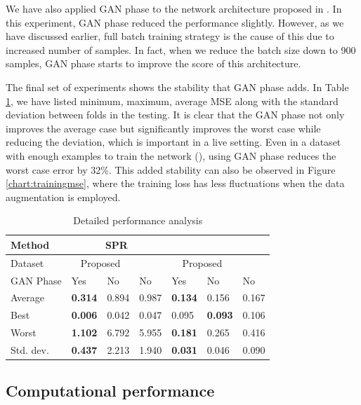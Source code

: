 \documentclass[10pt]{IEEEtran}
\begin{document}
We have also applied GAN phase to the network architecture proposed in \cite{paper0}. In this experiment, GAN phase reduced the performance slightly. However, as we have discussed earlier, full batch training strategy is the cause of this due to increased number of samples. In fact, when we reduce the batch size down to 900 samples, GAN phase starts to improve the score of this architecture.


The final set of experiments shows the stability that GAN phase adds. In Table \ref{tbl:all}, we have listed minimum, maximum, average MSE along with the standard deviation between folds in the testing. It is clear that the GAN phase not only improves the average case but significantly improves the worst case while reducing the deviation, which is important in a live setting. Even in a dataset with enough examples to train the network (\dszero), using GAN phase reduces the worst case error by 32\%. This added stability can also be observed in Figure \ref{chart:trainingmse}, where the training loss has less fluctuations when the data augmentation is employed.


\begin{table}
\caption{Detailed performance analysis}
\begin{tabular}{l|l|l|l|l|l|l}
	Method & \multicolumn{3}{c|}{SPR} & \multicolumn{3}{c}{\dszero{}} \\\hline
	Dataset & \multicolumn{2}{c|}{Proposed} & \cite{paper0}  & \multicolumn{2}{c|}{Proposed}   & \cite{paper0} \\\hline
	GAN Phase 			& Yes            & No    &  No     &   Yes            & No             & No    \\\hline
	Average   			& \textbf{0.314} & 0.894 & 0.987   &   \textbf{0.134} & 0.156          & 0.167 \\
	Best      			& \textbf{0.006} & 0.042 & 0.047   &   0.095          & \textbf{0.093} & 0.106 \\
	Worst     			& \textbf{1.102} & 6.792 & 5.955   &   \textbf{0.181} & 0.265          & 0.416 \\
	Std. dev.       	& \textbf{0.437} & 2.213 & 1.940   &   \textbf{0.031} & 0.046          & 0.090 \\
\end{tabular}
\label{tbl:all}
\end{table}


\subsection{Computational performance}
\end{document}
